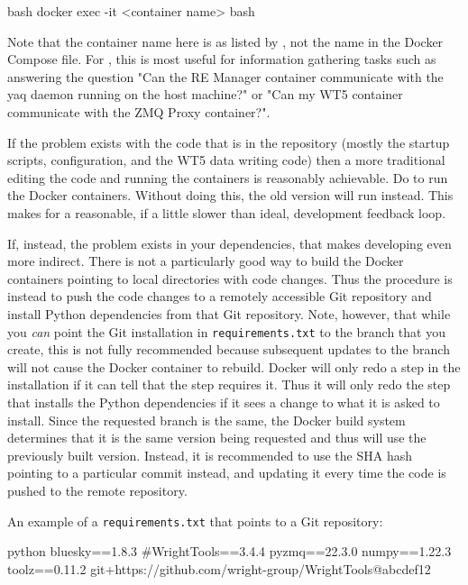 \begin{codefragment}{bash}
docker exec -it <container name> bash
\end{codefragment}

Note that the container name here is as listed by , not the name in the Docker Compose file.
For \biab, this is most useful for information gathering tasks such as answering the question "Can the RE Manager container communicate with the yaq daemon running on the host machine?" or "Can my WT5 container communicate with the ZMQ Proxy container?".

If the problem exists with the code that is in the \biab repository (mostly the startup scripts, configuration, and the WT5 data writing code) then a more traditional editing the code and running the containers is reasonably achievable.
Do  to run the Docker containers.
Without doing this, the old version will run instead.
This makes for a reasonable, if a little slower than ideal, development feedback loop.

If, instead, the problem exists in your dependencies, that makes developing even more indirect.
There is not a particularly good way to build the Docker containers pointing to local directories with code changes.
Thus the procedure is instead to push the code changes to a remotely accessible Git repository and install Python dependencies from that Git repository.
Note, however, that while you \textit{can} point the Git installation in \texttt{requirements.txt} to the branch that you create, this is not fully recommended because subsequent updates to the branch will not cause the Docker container to rebuild.
Docker will only redo a step in the installation if it can tell that the step requires it.
Thus it will only redo the step that installs the Python dependencies if it sees a change to what it is asked to install.
Since the requested branch is the same, the Docker build system determines that it is the same version being requested and thus will use the previously built version.
Instead, it is recommended to use the SHA hash pointing to a particular commit instead, and updating it every time the code is pushed to the remote repository.

An example of a \texttt{requirements.txt} that points to a Git repository:

\begin{codefragment}{python}
bluesky==1.8.3
#WrightTools==3.4.4
pyzmq==22.3.0
numpy==1.22.3
toolz==0.11.2
git+https://github.com/wright-group/WrightTools@abcdef12
\end{codefragment}

